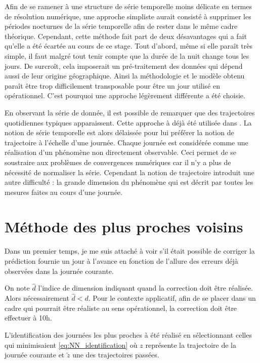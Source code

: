 \documentclass[12pt]{report}
\begin{document}
Afin de se ramener à une structure de série temporelle moins délicate en termes de résolution numérique, une approche simpliste aurait consisté à supprimer les périodes nocturnes de la série temporelle afin de rester dans le même cadre théorique. Cependant, cette méthode fait part de deux désavantages qui a fait qu'elle a été écartée au cours de ce stage. Tout d'abord, même si elle paraît très simple, il faut malgré tout tenir compte que la durée de la nuit change tous les jours. De surcroît, cela imposerait un pré-traitement des données qui dépend aussi de leur origine géographique. Ainsi la méthodologie et le modèle obtenu paraît être trop difficilement transposable pour être un jour utilisé en opérationnel. C'est pourquoi une approche légèrement différente a été choisie.

En observant la série de donnée, il est possible de remarquer que des trajectoires quotidiennes typiques apparaissent. Cette approche à déjà été utilisée dans \cite{latimier_gestion_2016}. La notion de série temporelle est alors délaissée pour lui préférer la notion de trajectoire à l'échelle d'une journée. Chaque journée est considérée comme une réalisation d'un phénomène non directement observable. Ceci permet de se soustraire aux problèmes de convergences numériques car il n'y a plus de nécessité de normaliser la série. Cependant la notion de trajectoire introduit une autre difficulté : la grande dimension du phénomène qui est décrit par toutes les mesures faites au cours d'une journée.

\section{Méthode des plus proches voisins}
Dans un premier temps, je me suis attaché à voir s'il était possible de corriger la prédiction fournie un jour à l'avance en fonction de l'allure des erreurs déjà observées dans la journée courante.

On note $\widehat{d}$ l'indice de dimension indiquant quand la correction doit être réalisée. Alors nécessairement $\widehat{d} < d$. Pour le contexte applicatif, afin de se placer dans un cadre qui pourrait être réaliste au sens opérationnel, la correction doit être effectuer à 10h.

L'identification des journées les plus proches à été réalisé en sélectionnant celles qui minimisaient \eqref{eq:NN_identification} où $z$ représente la trajectoire de la journée courante et $\widetilde{z}$ une des trajectoires passées. 
\end{document}

